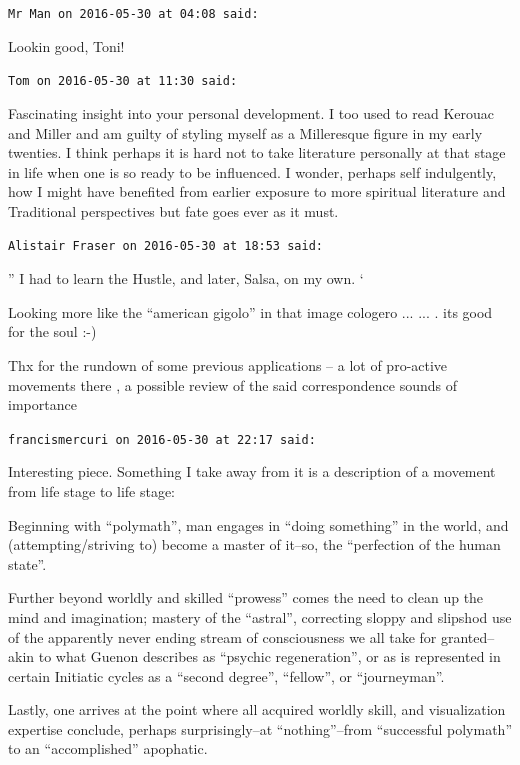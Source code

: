 \begin{footnotesize}
\begin{sffamily}
\texttt{Mr Man on 2016-05-30 at 04:08 said:}

Lookin good, Toni!

\hfill

\texttt{Tom on 2016-05-30 at 11:30 said:}

Fascinating insight into your personal development. I too used to read Kerouac and Miller and am guilty of styling myself as a Milleresque figure in my early twenties. I think perhaps it is hard not to take literature personally at that stage in life when one is so ready to be influenced. I wonder, perhaps self indulgently, how I might have benefited from earlier exposure to more spiritual literature and Traditional perspectives but fate goes ever as it must.

\hfill

\texttt{Alistair Fraser on 2016-05-30 at 18:53 said:}

'' I had to learn the Hustle, and later, Salsa, on my own. `

Looking more like the ``american gigolo'' in that image cologero
... ... . its good for the soul :-)


Thx for the rundown of some previous applications -- a lot of pro-active movements there , a possible review of the said correspondence sounds of importance

\hfill

\texttt{francismercuri on 2016-05-30 at 22:17 said:}

Interesting piece. Something I take away from it is a description of a movement from life stage to life stage:

Beginning with ``polymath'', man engages in ``doing something'' in the world, and (attempting/striving to) become a master of it--so, the ``perfection of the human state''.

Further beyond worldly and skilled ``prowess'' comes the need to clean up the mind and imagination; mastery of the ``astral'', correcting sloppy and slipshod use of the apparently never ending stream of consciousness we all take for granted--akin to what Guenon describes as ``psychic regeneration'', or as is represented in certain Initiatic cycles as a ``second degree'', ``fellow'', or ``journeyman''.

Lastly, one arrives at the point where all acquired worldly skill, and visualization expertise conclude, perhaps surprisingly--at ``nothing''--from ``successful polymath'' to an ``accomplished'' apophatic.


\end{sffamily}
\end{footnotesize}
